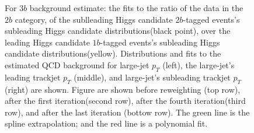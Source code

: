 \begin{figure}[htbp!]
\begin{center}
\caption{For $3b$ background estimate: the fits to the ratio of the data in the $2b$ category, of the sublleading Higgs candidate $2b$-tagged events's subleading Higgs candidate distributions(black point), over the leading Higgs candidate $1b$-tagged events's subleading Higgs candidate distributions(yellow). Distributions and fits to the estimated QCD background for large-\R jet $p_{T}$ (left),  the large-\R jet's leading trackjet $p_T$ (middle), and large-\R jet's subleading trackjet $p_T$ (right) are shown.  Figure are shown before reweighting (top row), after the first iteration(second row), after the fourth iteration(third row), and after the last iteration (bottow row). The green line is the spline extrapolation; and the red line is a polynomial fit.}
\label{fig:rw-3b-lead}
\end{center}
\end{figure}

